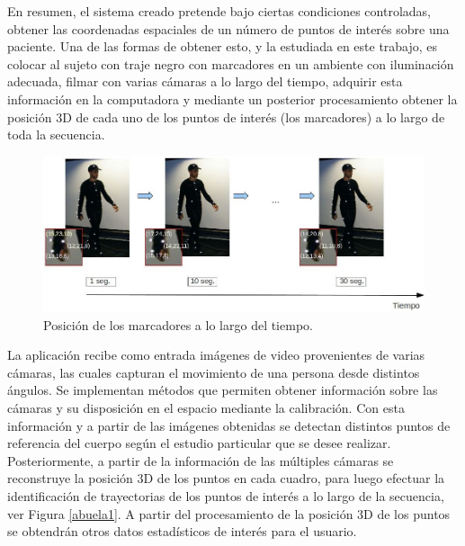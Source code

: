 En resumen, el sistema creado pretende bajo ciertas condiciones controladas, obtener las coordenadas espaciales de un número de puntos de interés sobre una paciente. Una de las formas de obtener esto, y la estudiada en este trabajo, es colocar al sujeto con traje negro con marcadores en un ambiente con iluminación adecuada, filmar con varias cámaras a lo largo del tiempo, adquirir esta información en la computadora y mediante un posterior procesamiento obtener la posición 3D de cada uno de los puntos de interés (los marcadores) a lo largo de toda la secuencia.

\begin{figure}[H]
\begin{center}
\includegraphics[scale=0.4]{img/Sistema_completo/diagrama_abuelas_2.jpg}
\end{center}
\caption{Posición de los marcadores a lo largo del tiempo.}
\label{abuela2}
\end{figure}

La aplicación recibe como entrada imágenes de video provenientes de varias cámaras, las cuales capturan el movimiento de una persona desde distintos ángulos. Se implementan métodos que permiten obtener información sobre las cámaras y su disposición en el espacio mediante la calibración. Con esta información y a partir de las imágenes obtenidas se detectan distintos puntos de referencia del cuerpo según el estudio particular que se desee realizar. Posteriormente, a partir de la información de las múltiples cámaras se reconstruye la posición 3D de los puntos en cada cuadro, para luego efectuar la identificación de trayectorias de los puntos de interés a lo largo de la secuencia, ver Figura \ref{abuela1}. A partir del procesamiento de la posición 3D de los puntos se obtendrán otros datos estadísticos de interés para el usuario.\\

